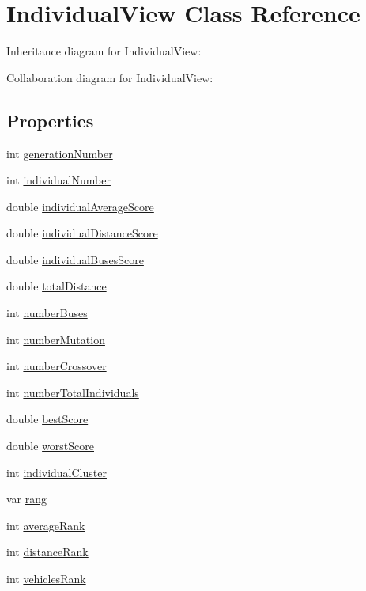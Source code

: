 \hypertarget{class_individual_view}{}\section{Individual\+View Class Reference}
\label{class_individual_view}


Inheritance diagram for Individual\+View\+:


Collaboration diagram for Individual\+View\+:
\subsection*{Properties}
\begin{DoxyCompactItemize}
\item 
int \hyperlink{class_individual_view_a1041b5080b9959361b6c9e5d1198c741}{generation\+Number}
\item 
int \hyperlink{class_individual_view_a63fd3b556f45623e6bbc016affba57ec}{individual\+Number}
\item 
double \hyperlink{class_individual_view_ae2797ff72ab51fde26cf28106a536930}{individual\+Average\+Score}
\item 
double \hyperlink{class_individual_view_a4a7bde66bdfd21ce7e8246ceef09a011}{individual\+Distance\+Score}
\item 
double \hyperlink{class_individual_view_a9fa40c39e9eea72f4107d8b1dabcdddb}{individual\+Buses\+Score}
\item 
double \hyperlink{class_individual_view_a8d08885c5f5158cd8c79d8992e705bfb}{total\+Distance}
\item 
int \hyperlink{class_individual_view_a41ba574a572f72e2b60b5d006ce43f65}{number\+Buses}
\item 
int \hyperlink{class_individual_view_a0a21901dcf937da97c5ce6fbf6063277}{number\+Mutation}
\item 
int \hyperlink{class_individual_view_a7cc766a22d5df8779757fdf48a8a6f74}{number\+Crossover}
\item 
int \hyperlink{class_individual_view_a7134bec775eee637bd2c782b1a5dc2ef}{number\+Total\+Individuals}
\item 
double \hyperlink{class_individual_view_a42d9d2738627b7ab2b062ed0d148bf15}{best\+Score}
\item 
double \hyperlink{class_individual_view_a65da50c477212f4969c5a2a1e87c1d82}{worst\+Score}
\item 
int \hyperlink{class_individual_view_a790d86cd55819ef715d76a1f54f237f7}{individual\+Cluster}
\item 
var \hyperlink{class_individual_view_ae8159ede7a7101e03aaae2cb771f621b}{rang}
\item 
int \hyperlink{class_individual_view_a42eee4cb17b3e2487b4e9af6a0ab8860}{average\+Rank}
\item 
int \hyperlink{class_individual_view_ad4abf982f3f07a65007ea3b79dcb037a}{distance\+Rank}
\item 
int \hyperlink{class_individual_view_a29df5add0d513ab175c490278042ce80}{vehicles\+Rank}
\end{DoxyCompactItemize}


